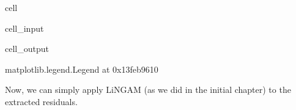 \documentclass[letterpaper,10pt,english]{jupyterBook}
\begin{document}
\begin{sphinxuseclass}{cell}\begin{sphinxVerbatimInput}

\begin{sphinxuseclass}{cell_input}
\begin{sphinxVerbatim}[commandchars=\\\{\}]
   \PYG{p}{[}\PYG{p}{]}
     \PYG{p}{[} \PYG{p}{]} \PYG{p}{[}\PYG{p}{]}
\end{sphinxVerbatim}

\end{sphinxuseclass}\end{sphinxVerbatimInput}
\begin{sphinxVerbatimOutput}

\begin{sphinxuseclass}{cell_output}
\begin{sphinxVerbatim}[commandchars=\\\{\}]
\PYGZlt{}matplotlib.legend.Legend at 0x13feb9610\PYGZgt{}
\end{sphinxVerbatim}

\noindent{}

\end{sphinxuseclass}\end{sphinxVerbatimOutput}

\end{sphinxuseclass}
\sphinxAtStartPar
Now, we can simply apply LiNGAM (as we did in the initial chapter) to the extracted residuals.
\end{document}
